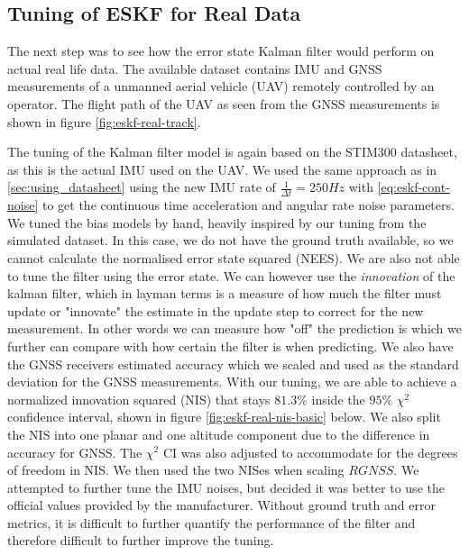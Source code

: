 \subsection{Tuning of ESKF for Real Data} \label{a2task3}
The next step was to see how the error state Kalman filter would perform on actual real life data. The available dataset contains IMU and GNSS measurements of a unmanned aerial vehicle (UAV) remotely controlled by an operator. The flight path of the UAV as seen from the GNSS measurements is shown in figure \ref{fig:eskf-real-track}.

The tuning of the Kalman filter model is again based on the STIM300 datasheet, as this is the actual IMU used on the UAV. We used the same approach as in \cref{sec:using_datasheet} using the new IMU rate of $\frac{1}{\Delta t} = 250Hz$ with \cref{eq:eskf-cont-noise} to get the continuous time acceleration and angular rate noise parameters. We tuned the bias models by hand, heavily inspired by our tuning from the simulated dataset. In this case, we do not have the ground truth available, so we cannot calculate the normalised error state squared (NEES). We are also not able to tune the filter using the error state. We can however use the \textit{innovation} of the kalman filter, which in layman terms is a measure of how much the filter must update or "innovate" the estimate in the update step to correct for the new measurement. In other words we can measure how "off" the prediction is which we further can compare with how certain the filter is when predicting. We also have the GNSS receivers estimated accuracy which we scaled and used as the standard deviation for the GNSS measurements. With our tuning, we are able to achieve a normalized innovation squared (NIS) that stays $81.3\%$ inside the $95\%$ $\chi^2$ confidence interval, shown in figure \ref{fig:eskf-real-nis-basic} below. We also split the NIS into one planar and one altitude component due to the difference in accuracy for GNSS. The $\chi^2$ CI was also adjusted to accommodate for the degrees of freedom in NIS. We then used the two NISes when scaling $RGNSS$. We attempted to further tune the IMU noises, but decided it was better to use the official values provided by the manufacturer. Without ground truth and error metrics, it is difficult to further quantify the performance of the filter and therefore difficult to further improve the tuning.




